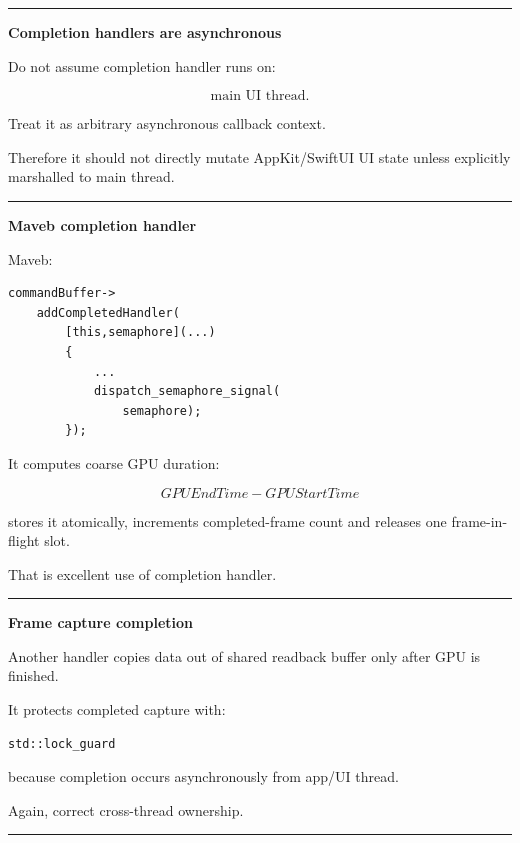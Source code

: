 \begin{center}\rule{0.5\linewidth}{0.5pt}\end{center}

\textbf{Completion handlers are asynchronous}

Do not assume completion handler runs on:

\[
\text{main UI thread}.
\]

Treat it as arbitrary asynchronous callback context.

Therefore it should not directly mutate AppKit/SwiftUI UI state unless explicitly marshalled to main thread.

\begin{center}\rule{0.5\linewidth}{0.5pt}\end{center}

\textbf{Maveb completion handler}

Maveb:

\begin{verbatim}
commandBuffer->
    addCompletedHandler(
        [this,semaphore](...)
        {
            ...
            dispatch_semaphore_signal(
                semaphore);
        });
\end{verbatim}

It computes coarse GPU duration:

\[
GPUEndTime-GPUStartTime
\]

stores it atomically, increments completed-frame count and releases one frame-in-flight slot.

That is excellent use of completion handler.

\begin{center}\rule{0.5\linewidth}{0.5pt}\end{center}

\textbf{Frame capture completion}

Another handler copies data out of shared readback buffer only after GPU is finished.

It protects completed capture with:

\begin{verbatim}
std::lock_guard
\end{verbatim}

because completion occurs asynchronously from app/UI thread.

Again, correct cross-thread ownership.

\begin{center}\rule{0.5\linewidth}{0.5pt}\end{center}

